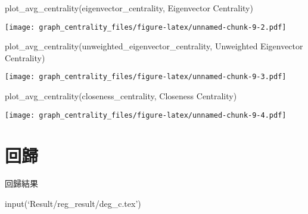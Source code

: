 \documentclass[
]{article}
\newenvironment{Shaded}{\begin{snugshade}}{\end{snugshade}}
\newcommand{\FunctionTok}[1]{\textcolor[rgb]{0.00,0.00,0.00}{#1}}
\newcommand{\NormalTok}[1]{#1}
\newcommand{\StringTok}[1]{\textcolor[rgb]{0.31,0.60,0.02}{#1}}
\begin{document}
\begin{Shaded}
\begin{Highlighting}[]
\FunctionTok{plot\_avg\_centrality}\NormalTok{(}\StringTok{\textquotesingle{}eigenvector\_centrality\textquotesingle{}}\NormalTok{, }
                    \StringTok{\textquotesingle{}Eigenvector Centrality\textquotesingle{}}\NormalTok{)}
\end{Highlighting}
\end{Shaded}

\texttt{[image: graph\_centrality\_files/figure-latex/unnamed-chunk-9-2.pdf]}

\begin{Shaded}
\begin{Highlighting}[]
\FunctionTok{plot\_avg\_centrality}\NormalTok{(}\StringTok{\textquotesingle{}unweighted\_eigenvector\_centrality\textquotesingle{}}\NormalTok{, }
                    \StringTok{\textquotesingle{}Unweighted Eigenvector Centrality\textquotesingle{}}\NormalTok{)}
\end{Highlighting}
\end{Shaded}

\texttt{[image: graph\_centrality\_files/figure-latex/unnamed-chunk-9-3.pdf]}

\begin{Shaded}
\begin{Highlighting}[]
\FunctionTok{plot\_avg\_centrality}\NormalTok{(}\StringTok{\textquotesingle{}closeness\_centrality\textquotesingle{}}\NormalTok{, }
                    \StringTok{\textquotesingle{}Closeness Centrality\textquotesingle{}}\NormalTok{)}
\end{Highlighting}
\end{Shaded}

\texttt{[image: graph\_centrality\_files/figure-latex/unnamed-chunk-9-4.pdf]}

\hypertarget{ux56deux6b78}{%
\section{回歸}\label{ux56deux6b78}}

回歸結果

input(`Result/reg\_result/deg\_c.tex')
\end{document}
